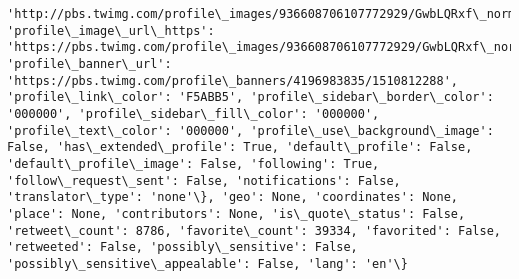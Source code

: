 \documentclass[11pt]{article}
\begin{document}
\begin{Verbatim}[commandchars=\\\{\}]
'http://pbs.twimg.com/profile\_images/936608706107772929/GwbLQRxf\_normal.jpg', 'profile\_image\_url\_https': 'https://pbs.twimg.com/profile\_images/936608706107772929/GwbLQRxf\_normal.jpg', 'profile\_banner\_url': 'https://pbs.twimg.com/profile\_banners/4196983835/1510812288', 'profile\_link\_color': 'F5ABB5', 'profile\_sidebar\_border\_color': '000000', 'profile\_sidebar\_fill\_color': '000000', 'profile\_text\_color': '000000', 'profile\_use\_background\_image': False, 'has\_extended\_profile': True, 'default\_profile': False, 'default\_profile\_image': False, 'following': True, 'follow\_request\_sent': False, 'notifications': False, 'translator\_type': 'none'\}, 'geo': None, 'coordinates': None, 'place': None, 'contributors': None, 'is\_quote\_status': False, 'retweet\_count': 8786, 'favorite\_count': 39334, 'favorited': False, 'retweeted': False, 'possibly\_sensitive': False, 'possibly\_sensitive\_appealable': False, 'lang': 'en'\}

\end{Verbatim}
\end{document}
